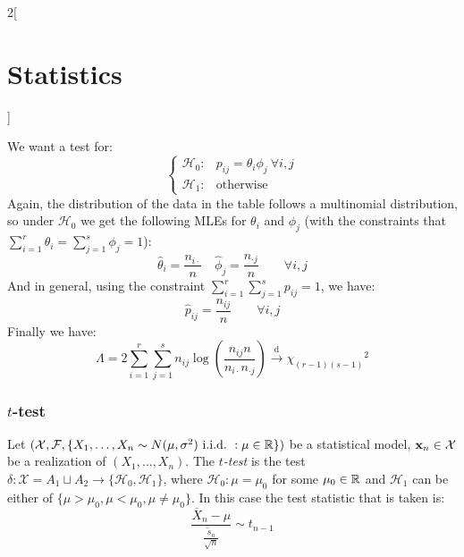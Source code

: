 \documentclass[../../../main_math.tex]{subfiles}
\begin{document}
\begin{multicols}{2}[\section{Statistics}]
\begin{definition}
    We want a test for:
    $$
      \begin{cases}
        \mathcal{H}_0: & p_{ij}=\theta_i\phi_j\ \forall i,j \\
        \mathcal{H}_1: & \text{otherwise}
      \end{cases}
    $$
    Again, the distribution of the data in the table follows a multinomial distribution, so under $\mathcal{H}_0$ we get the following MLEs for $\theta_i$ and $\phi_j$ (with the constraints that $\sum_{i=1}^r\theta_i=\sum_{j=1}^s\phi_j=1$):
    $$\hat\theta_i=\frac{n_{i\cdot}}{n}\quad\hat\phi_j=\frac{n_{\cdot j}}{n}\qquad\forall i,j$$
    And in general, using the constraint $\sum_{i=1}^r\sum_{j=1}^sp_{ij}=1$, we have: $$\hat{p}_{ij}=\frac{n_{ij}}{n}\qquad\forall i,j$$
    Finally we have: $$\Lambda=2\sum_{i=1}^r\sum_{j=1}^sn_{ij}\log\left(\frac{n_{ij}n}{n_{i\cdot}n_{\cdot j}}\right)\overset{\text{d}}{\longrightarrow}{\chi_{(r-1)(s-1)}}^2$$
  \end{definition}
  \subsubsection{\texorpdfstring{$t$}{t}-test}
  \begin{definition}[$t$-test]
    Let $(\mathcal{X},\mathcal{F},\{X_1,\ldots,X_n\sim N(\mu,\sigma^2)\ \text{i.i.d.\ } : \mu\in\mathbb{R}\})$ be a statistical model, $\boldsymbol{\mathrm{x}}_n\in\mathcal{X}$ be a realization of $(X_1,\ldots,X_n)$. The \emph{$t$-test} is the test $\delta:\mathcal{X}=A_1\sqcup A_2\rightarrow\{\mathcal{H}_0,\mathcal{H}_1\}$, where $\mathcal{H}_0:\mu=\mu_0$ for some $\mu_0\in\mathbb{R}$ and $\mathcal{H}_1$ can be either of $\{\mu>\mu_0,\mu<\mu_0,\mu\ne\mu_0\}$. In this case the test statistic that is taken is: $$\frac{\overline{X}_n-\mu}{\frac{\tilde{s}_n}{\sqrt{n}}}\sim t_{n-1}$$
  \end{definition}

\end{multicols}
\end{document}
